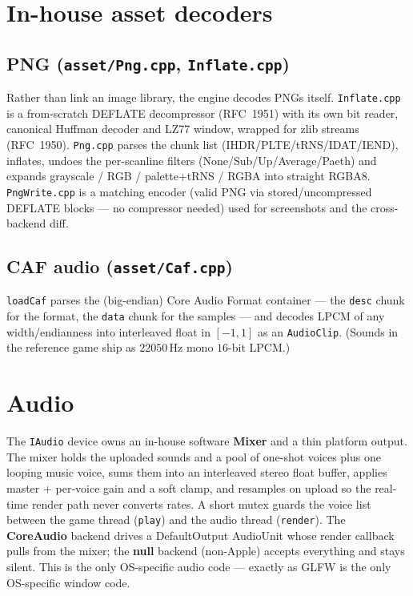 \documentclass[11pt]{report}
\newcommand{\code}[1]{\texttt{#1}}
\begin{document}
\chapter{In-house asset decoders}
\section{PNG (\code{asset/Png.cpp}, \code{Inflate.cpp})}
Rather than link an image library, the engine decodes PNGs itself.
\code{Inflate.cpp} is a from-scratch DEFLATE decompressor (RFC~1951) with its own
bit reader, canonical Huffman decoder and LZ77 window, wrapped for zlib streams
(RFC~1950). \code{Png.cpp} parses the chunk list (IHDR/PLTE/tRNS/IDAT/IEND),
inflates, undoes the per-scanline filters (None/Sub/Up/Average/Paeth) and expands
grayscale / RGB / palette+tRNS / RGBA into straight RGBA8. \code{PngWrite.cpp} is
a matching encoder (valid PNG via stored/uncompressed DEFLATE blocks --- no
compressor needed) used for screenshots and the cross-backend diff.

\section{CAF audio (\code{asset/Caf.cpp})}
\code{loadCaf} parses the (big-endian) Core Audio Format container --- the
\code{desc} chunk for the format, the \code{data} chunk for the samples --- and
decodes LPCM of any width/endianness into interleaved float in $[-1,1]$ as an
\code{AudioClip}. (Sounds in the reference game ship as $22050$\,Hz mono $16$-bit
LPCM.)

\chapter{Audio}\label{ch:audio}
The \code{IAudio} device owns an in-house software \textbf{Mixer} and a thin
platform output. The mixer holds the uploaded sounds and a pool of one-shot voices
plus one looping music voice, sums them into an interleaved stereo float buffer,
applies master + per-voice gain and a soft clamp, and resamples on upload so the
real-time render path never converts rates. A short mutex guards the voice list
between the game thread (\code{play}) and the audio thread (\code{render}). The
\textbf{CoreAudio} backend drives a DefaultOutput AudioUnit whose render callback
pulls from the mixer; the \textbf{null} backend (non-Apple) accepts everything and
stays silent. This is the only OS-specific audio code --- exactly as GLFW is the
only OS-specific window code.
\end{document}
